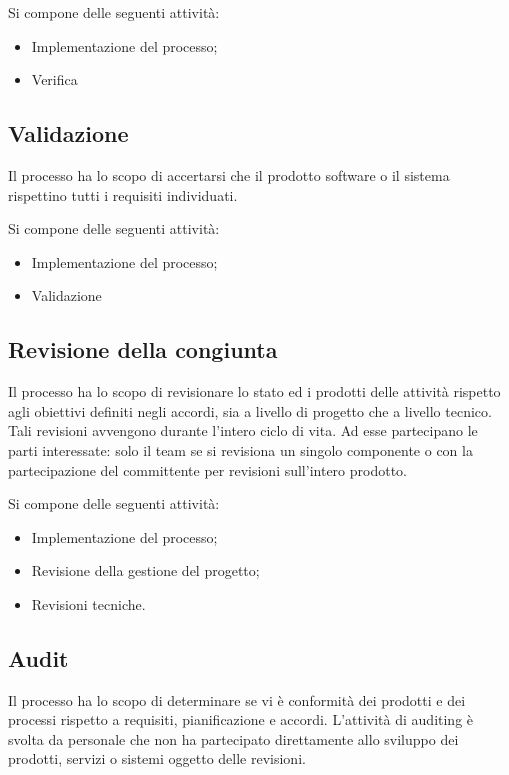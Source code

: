 Si compone delle seguenti attività:

\begin{itemize}
    \item Implementazione del processo;
    \item Verifica
\end{itemize}

\subsection{Validazione}

Il processo ha lo scopo di accertarsi che il prodotto software o il sistema rispettino tutti i requisiti individuati.

Si compone delle seguenti attività:

\begin{itemize}
    \item Implementazione del processo;
    \item Validazione
\end{itemize}

\subsection{Revisione della congiunta}
Il processo ha lo scopo di revisionare lo stato ed i prodotti delle attività rispetto agli obiettivi definiti negli accordi, sia a livello di progetto che a livello tecnico. Tali revisioni avvengono durante l'intero ciclo di vita. Ad esse partecipano le parti interessate: solo il team se si revisiona un singolo componente o con la partecipazione del committente per revisioni sull'intero prodotto.

Si compone delle seguenti attività:
\begin{itemize}
    \item Implementazione del processo;
    \item Revisione della gestione del progetto;
    \item Revisioni tecniche.
\end{itemize}


\subsection{Audit}

Il processo ha lo scopo di determinare se vi è conformità dei prodotti e dei processi rispetto a requisiti, pianificazione e accordi. L'attività di auditing è svolta da personale che non ha partecipato direttamente allo sviluppo dei prodotti, servizi o sistemi oggetto delle revisioni.

